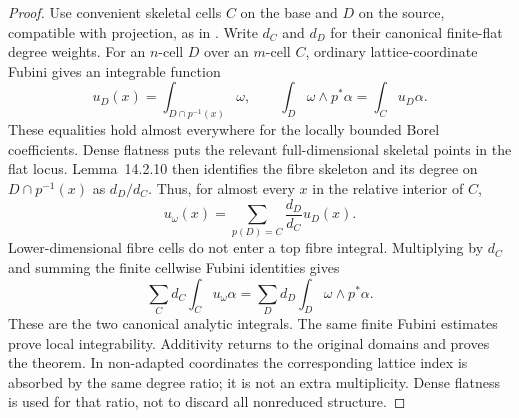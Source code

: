 \begin{proof}
Use convenient skeletal cells $C$ on the base and $D$ on the source,
compatible with projection, as in \cite[Lemmas~14.1.5 and~14.2.10]{CLD25}.
Write $d_C$ and $d_D$ for their canonical finite-flat degree weights.
For an $n$-cell $D$ over an $m$-cell $C$, ordinary lattice-coordinate
Fubini gives an integrable function
\[
 u_D(x)=\int_{D\cap p^{-1}(x)}\omega,
 \qquad
 \int_D\omega\wedge p^*\alpha=\int_Cu_D\alpha.
\]
These equalities hold almost everywhere for the locally bounded Borel
coefficients. Dense flatness puts the relevant full-dimensional
skeletal points in the flat locus. Lemma~14.2.10 then identifies the
fibre skeleton and its degree on $D\cap p^{-1}(x)$ as $d_D/d_C$.
Thus, for almost every $x$ in the relative interior of $C$,
\[
 u_\omega(x)=\sum_{p(D)=C}\frac{d_D}{d_C}u_D(x).
\]
Lower-dimensional fibre cells do not enter a top fibre integral.
Multiplying by $d_C$ and summing the finite cellwise Fubini identities
gives
\[
 \sum_C d_C\int_Cu_\omega\alpha
 =\sum_D d_D\int_D\omega\wedge p^*\alpha.
\]
These are the two canonical analytic integrals. The same finite
Fubini estimates prove local integrability. Additivity returns to the
original domains and proves the theorem. In non-adapted coordinates
the corresponding lattice index is absorbed by the same degree ratio;
it is not an extra multiplicity. Dense flatness is used for that
ratio, not to discard all nonreduced structure.
\end{proof}

